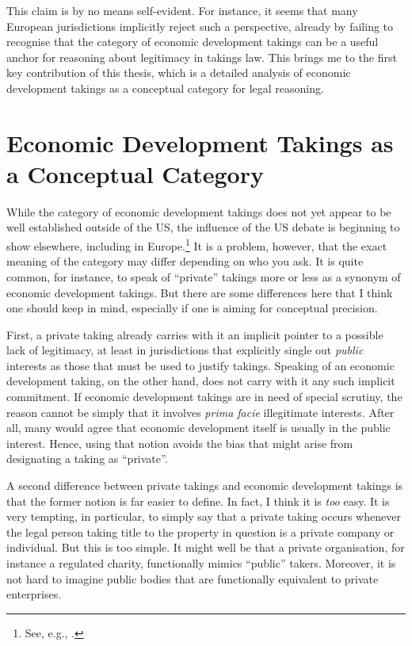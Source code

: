 \documentclass{book} %
\begin{document}
This claim is by no means self-evident. For instance, it seems that many European jurisdictions implicitly reject such a perspective, already by failing to recognise that the category of economic development takings can be a useful anchor for reasoning about legitimacy in takings law. This brings me to the first key contribution of this thesis, which is a detailed analysis of economic development takings as a conceptual category for legal reasoning.

\section{Economic Development Takings as a Conceptual Category}

While the category of economic development takings does not yet appear to be well established outside of the US, the influence of the US debate is beginning to show elsewhere, including in Europe.\footnote{See, e.g., \cite{verstappen14}.} It is a problem, however, that the exact meaning of the category may differ depending on who you ask. It is quite common, for instance, to speak of ``private'' takings more or less as a synonym of economic development takings. But there are some differences here that I think one should keep in mind, especially if one is aiming for conceptual precision.

First, a private taking already carries with it an implicit pointer to a possible lack of legitimacy, at least in jurisdictions that explicitly single out {\it public} interests as those that must be used to justify takings. Speaking of an economic development taking, on the other hand, does not carry with it any such implicit commitment. If economic development takings are in need of special scrutiny, the reason cannot be simply that it involves {\it prima facie} illegitimate interests. After all, many would agree that economic development itself is usually in the public interest. Hence, using that notion avoids the bias that might arise from designating a taking as ``private''.

A second difference between private takings and economic development takings is that the former notion is far easier to define. In fact, I think it is {\it too} easy. It is very tempting, in particular, to simply say that a private taking occurs whenever the legal person taking title to the property in question is a private company or individual. But this is too simple. It might well be that a private organisation, for instance a regulated charity, functionally mimics ``public'' takers. Moreover, it is not hard to imagine public bodies that are functionally equivalent to private enterprises. 
\end{document}
